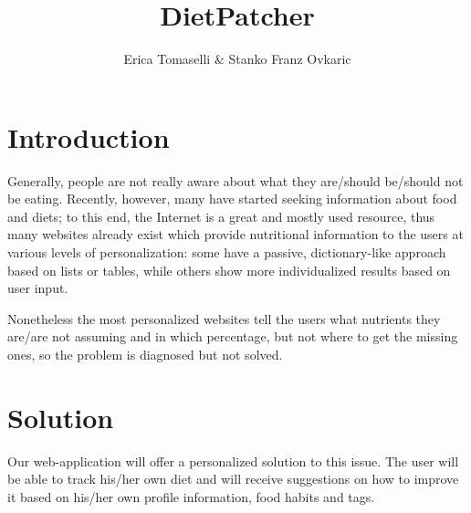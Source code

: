 \documentclass{article}
\begin{document}
\title{\huge \textbf{DietPatcher}}
\author{Erica Tomaselli \& Stanko Franz Ovkaric}
\date{}
\maketitle


\section{Introduction}


Generally, people are not really aware about what they are/should be/should not be eating. Recently, however, many have started seeking information about food and diets; to this end, the Internet is a great and mostly used resource, thus many websites already exist which provide nutritional information to the users at various levels of personalization: some have a passive, dictionary-like approach based on lists or tables, while others show more individualized results based on user input.

Nonetheless the most personalized websites tell the users what nutrients they are/are not assuming and in which percentage, but not where to get the missing ones, so the problem is diagnosed but not solved.

\section{Solution}
Our web-application will offer a personalized solution to this issue. The user will be able to track his/her own diet and will receive suggestions on how to improve it based on his/her own profile information, food habits and tags.
\end{document}
